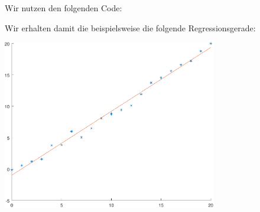 \section{}

Wir nutzen den folgenden Code:



Wir erhalten damit die beispielsweise die folgende Regressionsgerade:

\begin{center}
  \includegraphics[width = 0.7\textwidth]{chapter_08/exercise_08_39_figure.pdf}
\end{center}
